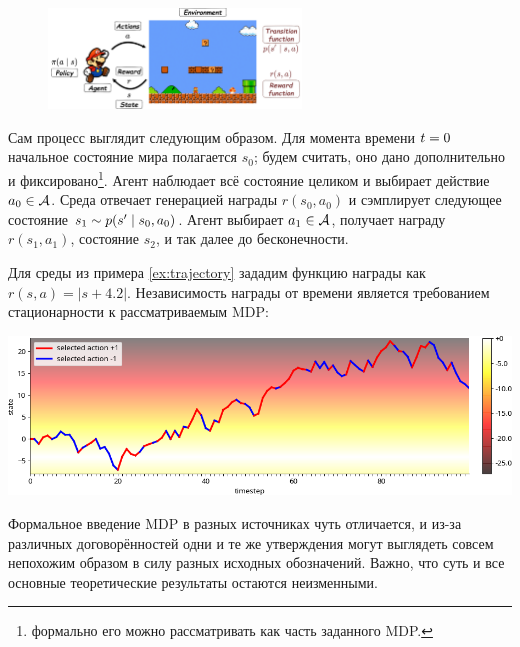 \begin{figure}
\vspace{-0.4cm}
\centering
\includegraphics[width=0.6\textwidth]{Images/RL.png}
\vspace{-0.5cm}
\end{figure}

Сам процесс выглядит следующим образом. Для момента времени $t \HM= 0$ начальное состояние мира полагается $s_0$; будем считать, оно дано дополнительно и фиксировано\footnote{формально его можно рассматривать как часть заданного MDP.}. Агент наблюдает всё состояние целиком и выбирает действие $a_0 \HM\in \A$. Среда отвечает генерацией награды $r(s_0, a_0)$ и сэмплирует следующее состояние $s_1 \HM\sim p(s' \HM\mid s_0, a_0)$. Агент выбирает $a_1 \HM\in \A$, получает награду $r(s_1, a_1)$, состояние $s_2$, и так далее до бесконечности.

\begin{example}
Для среды из примера \ref{ex:trajectory} зададим функцию награды как $r(s, a) = |s + 4.2|$. Независимость награды от времени является требованием стационарности к рассматриваемым MDP:
\begin{center}
\includegraphics[width=\textwidth]{Images/traj_rew.png}
\end{center}
\end{example}

Формальное введение MDP в разных источниках чуть отличается, и из-за различных договорённостей одни и те же утверждения могут выглядеть совсем непохожим образом в силу разных исходных обозначений. Важно, что суть и все основные теоретические результаты остаются неизменными.

